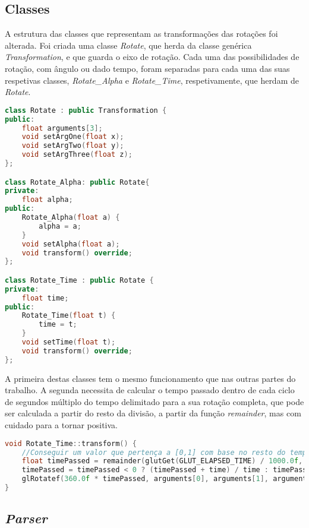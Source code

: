 \documentclass[14pt, a4 paper]{report}
\begin{document}
\subsection{Classes}

A estrutura das classes que representam as transformações das rotações foi alterada. Foi criada uma classe \textit{Rotate}, que herda da classe genérica \textit{Transformation}, e que guarda o eixo de rotação. Cada uma das possibilidades de rotação, com ângulo ou dado tempo, foram separadas para cada uma das suas respetivas classes, \textit{Rotate\_Alpha} e \textit{Rotate\_Time}, respetivamente, que herdam de \textit{Rotate}.

\begin{lstlisting}[language=c++]
class Rotate : public Transformation {
public:
    float arguments[3];
    void setArgOne(float x);
    void setArgTwo(float y);
    void setArgThree(float z);
};

class Rotate_Alpha: public Rotate{
private:
    float alpha;
public:
    Rotate_Alpha(float a) {
        alpha = a;
    }
    void setAlpha(float a);
    void transform() override;
};

class Rotate_Time : public Rotate {
private:
    float time;
public:
    Rotate_Time(float t) {
        time = t;
    }
    void setTime(float t);
    void transform() override;
};
\end{lstlisting}

A primeira destas classes tem o mesmo funcionamento que nas outras partes do trabalho. A segunda necessita de calcular o tempo passado dentro de cada ciclo de segundos múltiplo do tempo delimitado para a sua rotação completa, que pode ser calculada a partir do resto da divisão, a partir da função \textit{remainder}, mas com cuidado para a tornar positiva.

\begin{lstlisting}[language = c++]
void Rotate_Time::transform() {
    //Conseguir um valor que pertença a [0,1] com base no resto do tempo passado desde o ultimo múltiplo de 
    float timePassed = remainder(glutGet(GLUT_ELAPSED_TIME) / 1000.0f, time);
    timePassed = timePassed < 0 ? (timePassed + time) / time : timePassed / time;
    glRotatef(360.0f * timePassed, arguments[0], arguments[1], arguments[2]);
}
\end{lstlisting}

\subsection{\textit{Parser}}
\end{document}
